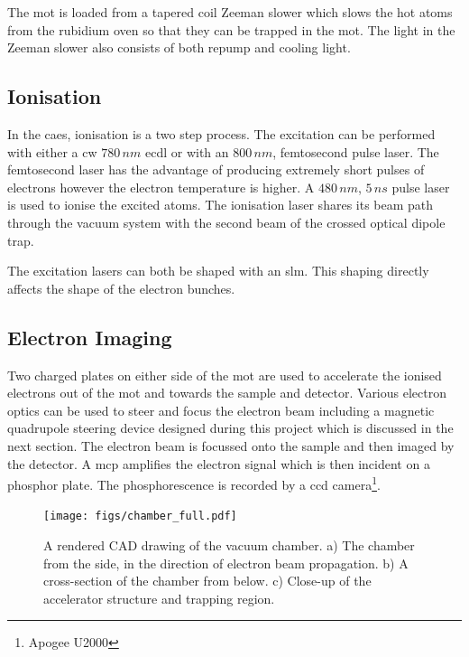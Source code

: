 The \gls{mot} is loaded from a tapered coil Zeeman slower which slows the hot atoms from the rubidium oven so that they can be trapped in the \gls{mot}. The light in the Zeeman slower also consists of both repump and cooling light.

\subsection{Ionisation}

In the \gls{caes}, ionisation is a two step process. The excitation can be performed with either a \gls{cw} $780\,\unit{nm}$ \gls{ecdl} or with an $800\,\unit{nm}$, femtosecond pulse laser. The femtosecond laser has the advantage of producing extremely short pulses of electrons however the electron temperature is higher\cite{mcculloch_high_2012}. A $480\,\unit{nm}$, $5\,\unit{ns}$ pulse laser is used to ionise the excited atoms. The ionisation laser shares its beam path through the vacuum system with the second beam of the crossed optical dipole trap.

The excitation lasers can both be shaped with an \gls{slm}. This shaping directly affects the shape of the electron bunches\cite{mcculloch_arbitrarily_2011}.

\subsection{Electron Imaging}

Two charged plates on either side of the \gls{mot} are used to accelerate the ionised electrons out of the \gls{mot} and towards the sample and detector. Various electron optics can be used to steer and focus the electron beam including a magnetic quadrupole steering device designed during this project which is discussed in the next section. The electron beam is focussed onto the sample and then imaged by the detector. A \gls{mcp} amplifies the electron signal which is then incident on a phosphor plate. The phosphorescence is recorded by a \gls{ccd} camera\footnote{Apogee U2000}.

\begin{landscape}
\begin{figure}[p]
\centering
\texttt{[image: figs/chamber\_full.pdf]}
 \caption{A rendered CAD drawing of the vacuum chamber\cite{sheludko_shaped_2010}. a) The chamber from the side, in the direction of electron beam propagation. b) A cross-section of the chamber from below. c) Close-up of the accelerator structure and trapping region.}
\label{fig:app_complete_chamber}
\end{figure}
\end{landscape}

